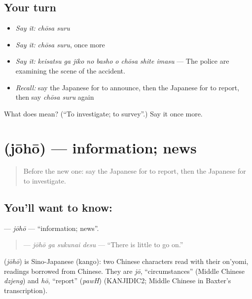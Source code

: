\subsection*{Your turn}
\begin{itemize}
\raggedright
  \item \emph{Say it:} \emph{chōsa suru}
  \item \emph{Say it:} \emph{chōsa suru}, once more
  \item \emph{Say it:} \emph{keisatsu ga jiko no basho o chōsa shite imasu} — The police are examining the scene of the accident.
  \item \emph{Recall:} say the Japanese for to announce, then the Japanese for to report, then say \emph{chōsa suru} again
\end{itemize}

\begin{tcolorbox}[breakable,colback=teal!4,colframe=teal!35!black,title={Before you move on}]
What does  mean? (\textquotedblleft{}To investigate; to survey\textquotedblright{}.) Say it once more.
\end{tcolorbox}
\section[\texorpdfstring{\ja{じょうほう} (jōhō)}{じょうほう (jōhō)}]{ (jōhō) — information; news}

\label{lesson:JA-C283-jouhou}



\begin{quote}
Before the new one: say the Japanese for to report, then the Japanese for to investigate.
\end{quote}

\subsection*{You'll want to know: }
\textbf{} — \emph{jōhō} — \textquotedblleft{}information; news\textquotedblright{}.

\begin{quote}
\textbf{ } — \emph{jōhō ga sukunai desu} — \textquotedblleft{}There is little to go on.\textquotedblright{}
\end{quote}

\begin{cousinweb}
\textbf{} (\emph{jōhō}) is Sino-Japanese (kango): two Chinese characters read with their on'yomi, readings borrowed from Chinese. They are \emph{jō}, \textquotedblleft{}circumstances\textquotedblright{} (Middle Chinese \emph{dzjeng}) and \emph{hō}, \textquotedblleft{}report\textquotedblright{} (\emph{pawH}) (KANJIDIC2; Middle Chinese in Baxter's transcription).
\end{cousinweb}

